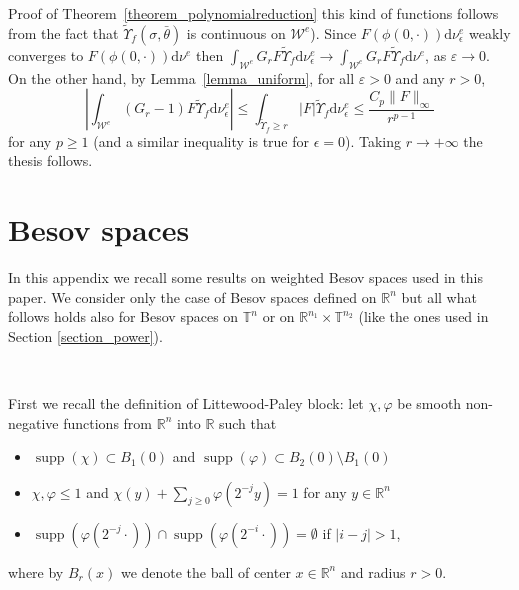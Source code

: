 \documentclass[a4paper,10pt]{article}
\newcommand{\mathd}{\mathrm{d}}
\newcommand{\tmop}[1]{\ensuremath{\operatorname{#1}}}
\newenvironment{proof*}[1]{\noindent\textbf{#1\ }}{\hspace*{\fill}$\Box$\medskip}
\begin{document}
\begin{proof*}{Proof of Theorem~\ref{theorem_polynomialreduction}}
  this kind of functions follows from the fact that $\tilde{\Upsilon}_f
  (\sigma, \bar{\theta})$ is continuous on $\mathcal{W}^e$). Since $F (\phi
  (0, \cdot)) \mathd \nu_{\epsilon}^e$ weakly converges to $F (\phi (0,
  \cdot)) \mathd \nu^e$ then $\int_{\mathcal{W}^e} G_r F \tilde{\Upsilon}_f
  \mathd \nu^e_{\epsilon} \rightarrow \int_{\mathcal{W}^e} G_r F
  \tilde{\Upsilon}_f \mathd \nu^e$, as $\varepsilon \rightarrow 0$. On the
  other hand, by Lemma~\ref{lemma_uniform}, for all $\varepsilon > 0$ and any
  $r > 0$,
  \[ \left| \int_{\mathcal{W}^e} (G_r - 1) F \tilde{\Upsilon}_f \mathd
     \nu^e_{\epsilon} \right| \leqslant \int_{\tilde{\Upsilon}_f \geqslant r}
     | F | \tilde{\Upsilon}_f \mathd \nu^e_{\epsilon} \leqslant \frac{C_p \| F
     \|_{\infty}}{r^{p - 1}} \]
  for any $p \geq 1$ (and a similar inequality is true for $\epsilon = 0$).
  Taking $r \rightarrow + \infty$ the thesis follows.
\end{proof*}

\appendix\section{Besov spaces}\label{appendix_besov}

In this appendix we recall some results on weighted Besov spaces used in this
paper. We consider only the case of Besov spaces defined on $\mathbb{R}^n$ but
all what follows holds also for Besov spaces on $\mathbb{T}^n$ or on
$\mathbb{R}^{n_1} \times \mathbb{T}^{n_2}$ (like the ones used in Section
\ref{section_power}).

\

First we recall the definition of Littewood-Paley block: let $\chi, \varphi$
be smooth non-negative functions from $\mathbb{R}^n$ into $\mathbb{R}$ such
that
\begin{itemize}
  \item $\tmop{supp} (\chi) \subset B_1 (0)$ and $\tmop{supp} (\varphi)
  \subset B_2 (0) \setminus B_1 (0)$
  
  \item $\chi, \varphi \leq 1$ and $\chi (y) + \sum_{j \geq 0} \varphi (2^{-
  j} y) = 1$ for any $y \in \mathbb{R}^n$
  
  \item $\tmop{supp} (\varphi (2^{- j} \cdot)) \cap \tmop{supp} (\varphi (2^{-
  i} \cdot)) = \emptyset$ if $| i - j | > 1$,
\end{itemize}
where by $B_r (x)$ we denote the ball of center $x \in \mathbb{R}^n$ and
radius $r > 0$.
\end{document}

